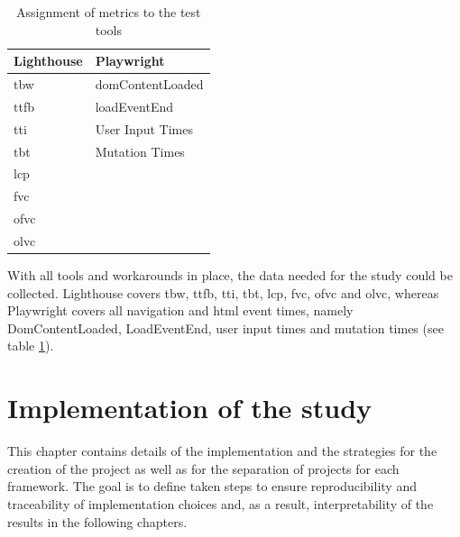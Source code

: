 \documentclass[a4paper, 12pt]{article}
\begin{document}
\begin{table}[h]
  \begin{center}
    \begin{tabular}{|l|l|}
      \hline
      \textbf{Lighthouse} & \textbf{Playwright} \\ \hline
      \acrfull{tbw}       & domContentLoaded    \\ \hline
      \acrfull{ttfb}      & loadEventEnd        \\ \hline
      \acrfull{tti}       & User Input Times    \\ \hline
      \acrfull{tbt}       & Mutation Times      \\ \hline
      \acrfull{lcp}       &                     \\ \hline
      \acrfull{fvc}       &                     \\ \hline
      \acrfull{ofvc}      &                     \\ \hline
      \acrfull{olvc}      &                     \\ \hline
    \end{tabular}
  \end{center}
  \caption{Assignment of metrics to the test tools}
  \label{tab:metricassignment}
\end{table}

With all tools and workarounds in place, the data needed for the study could be collected.
Lighthouse covers \acrshort{tbw}, \acrshort{ttfb}, \acrshort{tti}, \acrshort{tbt}, \acrshort{lcp}, \acrshort{fvc}, \acrshort{ofvc} and \acrshort{olvc}, whereas Playwright covers all navigation and \acrshort{html} event times, namely DomContentLoaded, LoadEventEnd, user input times and mutation times (see table \ref{tab:metricassignment}).

\section{Implementation of the study}\label{sec:implementation} 
% 

This chapter contains details of the implementation and the strategies for the creation of the project as well as for the separation of projects for each framework.
The goal is to define taken steps to ensure reproducibility and traceability of implementation choices and, as a result, interpretability of the results in the following chapters.
\end{document}
